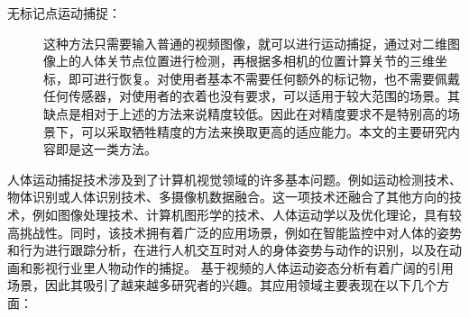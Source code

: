 \begin{description}
    \item[无标记点运动捕捉：]这种方法只需要输入普通的视频图像，就可以进行运动捕捉，通过对二维图像上的人体关节点位置进行检测，再根据多相机的位置计算关节的三维坐标，即可进行恢复。对使用者基本不需要任何额外的标记物，也不需要佩戴任何传感器，对使用者的衣着也没有要求，可以适用于较大范围的场景。其缺点是相对于上述的方法来说精度较低。因此在对精度要求不是特别高的场景下，可以采取牺牲精度的方法来换取更高的适应能力。本文的主要研究内容即是这一类方法。
\end{description}

人体运动捕捉技术涉及到了计算机视觉领域的许多基本问题。例如运动检测技术、物体识别或人体识别技术、多摄像机数据融合。这一项技术还融合了其他方向的技术，例如图像处理技术、计算机图形学的技术、人体运动学以及优化理论，具有较高挑战性。同时，该技术拥有着广泛的应用场景，例如在智能监控中对人体的姿势和行为进行跟踪分析，在进行人机交互时对人的身体姿势与动作的识别，以及在动画和影视行业里人物动作的捕捉。
基于视频的人体运动姿态分析有着广阔的引用场景，因此其吸引了越来越多研究者的兴趣。其应用领域主要表现在以下几个方面：

